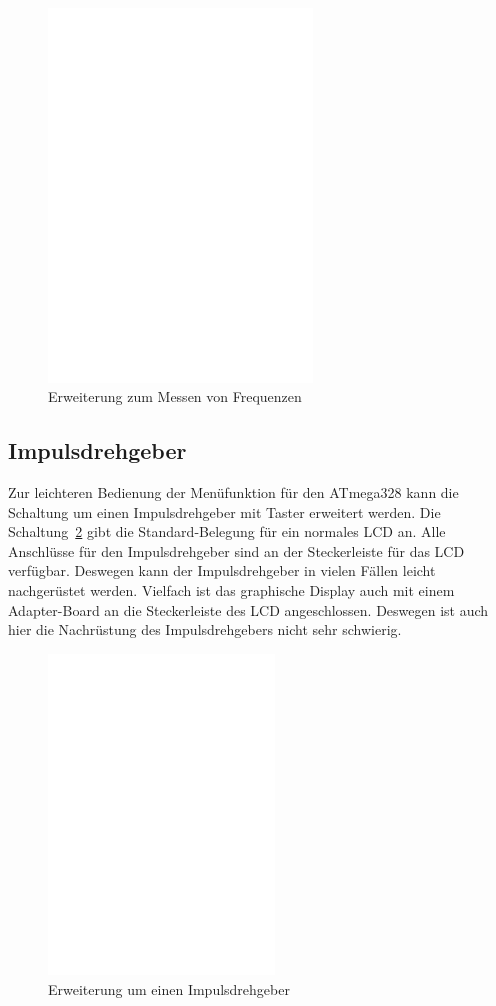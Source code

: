 \begin{figure}[H]
\centering
\includegraphics[width=7cm]{../FIG/Frequency_addon.eps}
\caption{Erweiterung zum Messen von Frequenzen}
\label{fig:FreqMes}
\end{figure}

\subsection{Impulsdrehgeber}

Zur leichteren Bedienung der Menüfunktion für den ATmega328 kann die Schaltung um einen
Impulsdrehgeber mit Taster erweitert werden. Die Schaltung~\ref{fig:RotExt} gibt die Standard-Belegung
für ein normales LCD an. Alle Anschlüsse für den Impulsdrehgeber
sind an der Steckerleiste für das LCD verfügbar. Deswegen kann der Impulsdrehgeber in vielen Fällen 
leicht nachgerüstet werden. Vielfach ist das graphische Display auch mit einem Adapter-Board an die
Steckerleiste des LCD angeschlossen. Deswegen ist auch hier die Nachrüstung des Impulsdrehgebers nicht
sehr schwierig.

\begin{figure}[H]
\centering
\includegraphics[width=6cm]{../FIG/rotary_extension.eps}
\caption{Erweiterung um einen Impulsdrehgeber}
\label{fig:RotExt}
\end{figure}

